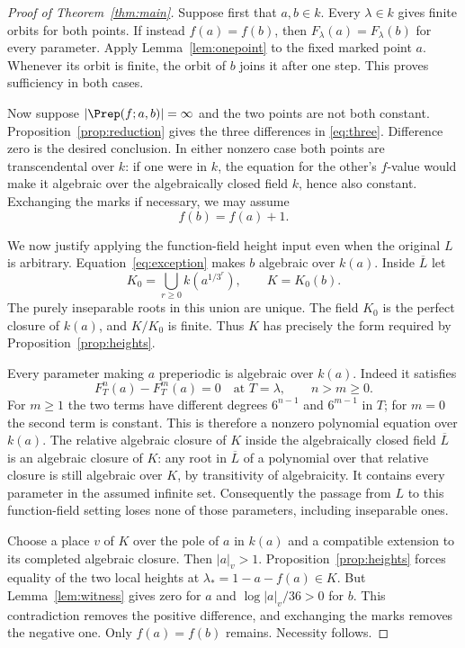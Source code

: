 \begin{proof}[Proof of Theorem~\ref{thm:main}]
Suppose first that $a,b\in k$. Every $\lambda\in k$ gives finite
orbits for both points. If instead $f(a)=f(b)$, then
$F_\lambda(a)=F_\lambda(b)$ for every parameter. Apply
Lemma~\ref{lem:onepoint} to the fixed marked point $a$.
Whenever its orbit is finite, the orbit of $b$ joins it after one
step. This proves sufficiency in both cases.

Now suppose $|\Prep(f;a,b)|=\infty$ and the two points are not
both constant. Proposition~\ref{prop:reduction} gives the three
differences in \eqref{eq:three}. Difference zero is the desired
conclusion. In either nonzero case both points are transcendental
over $k$: if one were in $k$, the equation for the other's
$f$-value would make it algebraic over the algebraically closed
field $k$, hence also constant. Exchanging the marks if necessary,
we may assume
\begin{equation}\label{eq:exception}
 f(b)=f(a)+1.
\end{equation}

We now justify applying the function-field height input even when
the original $L$ is arbitrary. Equation~\eqref{eq:exception} makes
$b$ algebraic over $k(a)$. Inside $\overline L$ let
\begin{equation}\label{eq:K}
 K_0=\bigcup_{r\ge0}k(a^{1/3^r}),\qquad K=K_0(b).
\end{equation}
The purely inseparable roots in this union are unique. The field
$K_0$ is the perfect closure of $k(a)$, and $K/K_0$ is finite.
Thus $K$ has precisely the form required by
Proposition~\ref{prop:heights}.

Every parameter making $a$ preperiodic is algebraic over $k(a)$.
Indeed it satisfies
\[
 F_T^n(a)-F_T^m(a)=0
 \quad\text{at }T=\lambda,\qquad n>m\ge0.
\]
For $m\ge1$ the two terms have different degrees $6^{n-1}$ and
$6^{m-1}$ in $T$; for $m=0$ the second term is constant.
This is therefore a nonzero polynomial equation over $k(a)$.
The relative algebraic closure of $K$ inside the algebraically
closed field $\overline L$ is an algebraic closure of $K$:
any root in $\overline L$ of a polynomial over that relative
closure is still algebraic over $K$, by transitivity of algebraicity.
It contains every parameter in the assumed infinite set.
Consequently the passage from $L$ to this function-field setting
loses none of those parameters, including inseparable ones.

Choose a place $v$ of $K$ over the pole of $a$ in $k(a)$ and a
compatible extension to its completed algebraic closure. Then
$|a|_v>1$. Proposition~\ref{prop:heights} forces equality of the
two local heights at $\lambda_*=1-a-f(a)\in K$. But
Lemma~\ref{lem:witness} gives zero for $a$ and
$\log|a|_v/36>0$ for $b$. This contradiction removes the positive
difference, and exchanging the marks removes the negative one.
Only $f(a)=f(b)$ remains. Necessity follows.
\end{proof}
